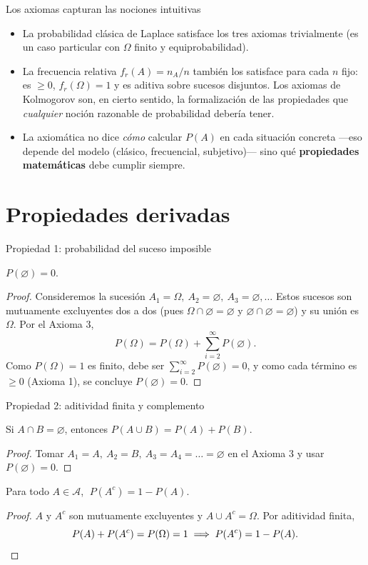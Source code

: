 \documentclass[aspectratio=169,11pt]{beamer}
\begin{document}
\begin{frame}{Los axiomas capturan las nociones intuitivas}
\begin{itemize}
\item La probabilidad clásica de Laplace satisface los tres axiomas trivialmente (es un caso particular con $\Omega$ finito y equiprobabilidad).
\item La frecuencia relativa $f_r(A)=n_A/n$ también los satisface para cada $n$ fijo: es $\geq 0$, $f_r(\Omega)=1$ y es aditiva sobre sucesos disjuntos. Los axiomas de Kolmogorov son, en cierto sentido, la formalización de las propiedades que \emph{cualquier} noción razonable de probabilidad debería tener.
\item La axiomática no dice \emph{cómo} calcular $P(A)$ en cada situación concreta —eso depende del modelo (clásico, frecuencial, subjetivo)— sino qué \textbf{propiedades matemáticas} debe cumplir siempre.
\end{itemize}
\end{frame}

\section{Propiedades derivadas}

\begin{frame}{Propiedad 1: probabilidad del suceso imposible}
\begin{theorem}
$P(\varnothing) = 0$.
\end{theorem}
\begin{proof}
Consideremos la sucesión $A_1=\Omega,\ A_2=\varnothing,\ A_3=\varnothing,\dots$ Estos sucesos son mutuamente excluyentes dos a dos (pues $\Omega \cap \varnothing = \varnothing$ y $\varnothing\cap\varnothing=\varnothing$) y su unión es $\Omega$. Por el Axioma 3,
\[
P(\Omega) = P(\Omega) + \sum_{i=2}^{\infty} P(\varnothing).
\]
Como $P(\Omega)=1$ es finito, debe ser $\sum_{i=2}^\infty P(\varnothing) = 0$, y como cada término es $\geq 0$ (Axioma 1), se concluye $P(\varnothing)=0$. \qedhere
\end{proof}
\end{frame}

\begin{frame}{Propiedad 2: aditividad finita y complemento}
\begin{theorem}
Si $A \cap B = \varnothing$, entonces $P(A\cup B) = P(A)+P(B)$.
\end{theorem}
\begin{proof}
Tomar $A_1=A,\ A_2=B,\ A_3=A_4=\dots=\varnothing$ en el Axioma 3 y usar $P(\varnothing)=0$.
\end{proof}

\begin{theorem}
Para todo $A \in \mathcal{A}$, $\; P(A^c) = 1 - P(A)$.
\end{theorem}
\begin{proof}
$A$ y $A^c$ son mutuamente excluyentes y $A \cup A^c = \Omega$. Por aditividad finita,
\[
P(A) + P(A^c) = P(\Omega) = 1 \;\Longrightarrow\; P(A^c) = 1-P(A). \qedhere
\]
\end{proof}
\end{frame}
\end{document}
